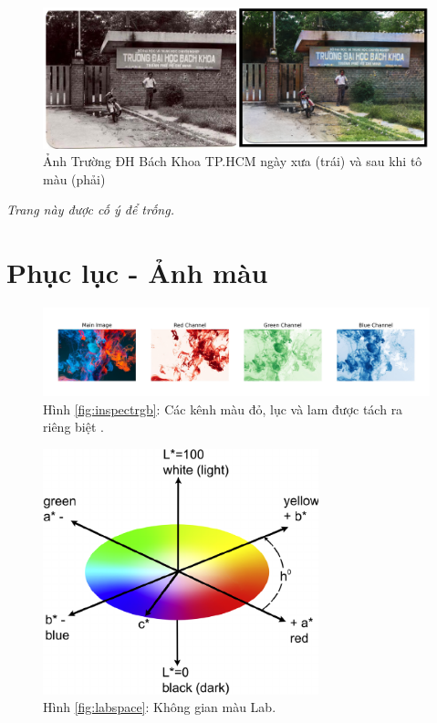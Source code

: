 \documentclass[a4paper, 12pt]{article}
\begin{document}
\begin{figure}[!h]
\centering
\includegraphics[width=15cm]{images/5_1.PNG}
\caption{Ảnh Trường ĐH Bách Khoa TP.HCM ngày xưa (trái) và sau khi tô màu (phải)}
\label{fig:bkhcmold}
\end{figure}

\newpage
\vspace*{\fill}
{\centering \textit{Trang này được cố ý để trống.}\par}
\vspace{\fill}
\newpage

\section{Phục lục - Ảnh màu}

\begin{figure}[!h]
\captionsetup{width=0.8\textwidth}
\centering
\includegraphics[width=16cm]{images/2_1.jpeg}
\caption*{Hình \ref{fig:inspectrgb}: Các kênh màu đỏ, lục và lam được tách ra riêng biệt \cite{moeincolorization2020}.}
\end{figure}

\begin{figure}[!h]
\captionsetup{width=0.8\textwidth}
\centering
\includegraphics[width=8cm]{images/2_2.png}
\caption*{Hình \ref{fig:labspace}: Không gian màu Lab.}
\end{figure}
\end{document}

